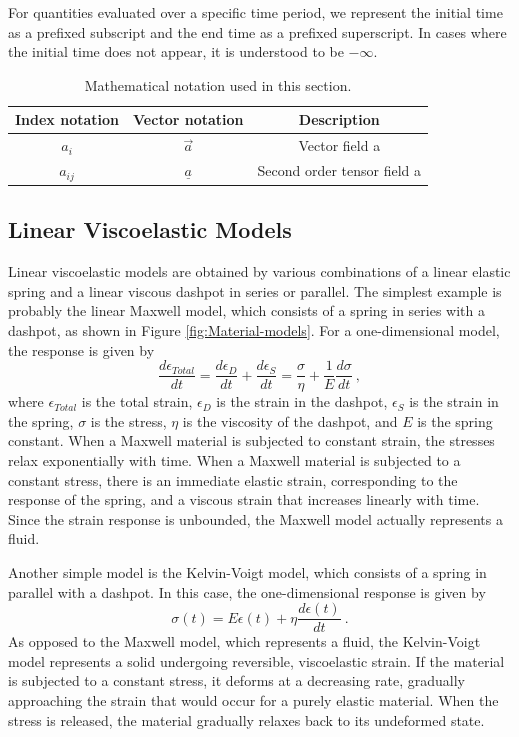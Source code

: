For quantities evaluated over a specific time period, we represent
the initial time as a prefixed subscript and the end time as a prefixed
superscript. In cases where the initial time does not appear, it is
understood to be $-\infty$.

\noindent \begin{center}
\begin{table}[H]
\noindent \centering{}\caption{\label{tab:Mathematical-notation}Mathematical notation used in this
section.}
\begin{tabular}{|c|c|c|}
\hline 
Index notation & Vector notation & Description\tabularnewline
\hline 
\hline 
$a_{i}$ & $\overrightarrow{a}$ & Vector field a\tabularnewline
\hline 
$a_{ij}$ & $\underline{a}$ & Second order tensor field a\tabularnewline
\hline 
\end{tabular}
\end{table}

\par\end{center}


\subsection{Linear Viscoelastic Models}

Linear viscoelastic models are obtained by various combinations of
a linear elastic spring and a linear viscous dashpot in series or
parallel. The simplest example is probably the linear Maxwell model,
which consists of a spring in series with a dashpot, as shown in Figure
\ref{fig:Material-models}. For a one-dimensional model, the response
is given by
\begin{equation}
\frac{d\epsilon_{Total}}{dt}=\frac{d\epsilon_{D}}{dt}+\frac{d\epsilon_{S}}{dt}=\frac{\sigma}{\eta}+\frac{1}{E}\frac{d\sigma}{dt}\:,
\end{equation}
where $\epsilon_{Total}$ is the total strain, $\epsilon_{D}$ is
the strain in the dashpot, $\epsilon_{S}$ is the strain in the spring,
$\sigma$ is the stress, $\eta$ is the viscosity of the dashpot,
and $E$ is the spring constant. When a Maxwell material is subjected
to constant strain, the stresses relax exponentially with time. When
a Maxwell material is subjected to a constant stress, there is an
immediate elastic strain, corresponding to the response of the spring,
and a viscous strain that increases linearly with time. Since the
strain response is unbounded, the Maxwell model actually represents
a fluid.

Another simple model is the Kelvin-Voigt model, which consists of
a spring in parallel with a dashpot. In this case, the one-dimensional
response is given by
\begin{equation}
\sigma\left(t\right)=E\epsilon\left(t\right)+\eta\frac{d\epsilon\left(t\right)}{dt}\:.
\end{equation}
As opposed to the Maxwell model, which represents a fluid, the Kelvin-Voigt
model represents a solid undergoing reversible, viscoelastic strain.
If the material is subjected to a constant stress, it deforms at a
decreasing rate, gradually approaching the strain that would occur
for a purely elastic material. When the stress is released, the material
gradually relaxes back to its undeformed state.

